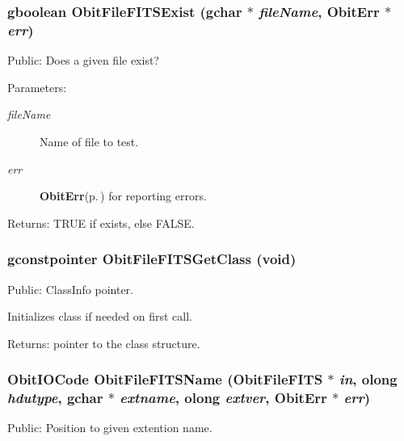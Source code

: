\subsubsection{\setlength{\rightskip}{0pt plus 5cm}gboolean Obit\-File\-FITSExist (gchar $\ast$ {\em file\-Name}, {\bf Obit\-Err} $\ast$ {\em err})}\label{ObitFileFITS_8h_a11}


Public: Does a given file exist? 

\begin{Desc}
\item[Parameters:]
\begin{description}
\item[{\em file\-Name}]Name of file to test. \item[{\em err}]{\bf Obit\-Err}{\rm (p.\,\pageref{structObitErr})} for reporting errors. \end{description}
\end{Desc}
\begin{Desc}
\item[Returns:]TRUE if exists, else FALSE. \end{Desc}
\subsubsection{\setlength{\rightskip}{0pt plus 5cm}gconstpointer Obit\-File\-FITSGet\-Class (void)}\label{ObitFileFITS_8h_a5}


Public: Class\-Info pointer. 

Initializes class if needed on first call. \begin{Desc}
\item[Returns:]pointer to the class structure. \end{Desc}
\subsubsection{\setlength{\rightskip}{0pt plus 5cm}Obit\-IOCode Obit\-File\-FITSName ({\bf Obit\-File\-FITS} $\ast$ {\em in}, {\bf olong} {\em hdutype}, gchar $\ast$ {\em extname}, {\bf olong} {\em extver}, {\bf Obit\-Err} $\ast$ {\em err})}\label{ObitFileFITS_8h_a13}


Public: Position to given extention name. 

